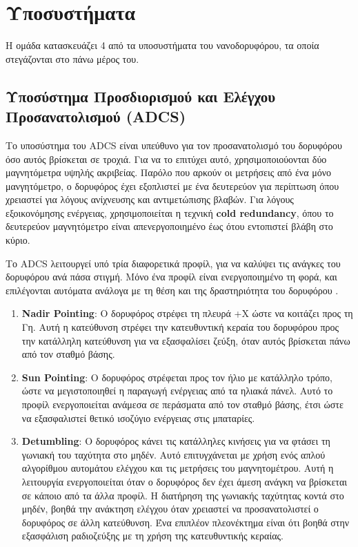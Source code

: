 \documentclass[a4paper,nobib,justified]{tufte-book}
\begin{document}
\section{Υποσυστήματα}
Η ομάδα κατασκευάζει 4 από τα υποσυστήματα του νανοδορυφόρου, τα οποία στεγάζονται στο πάνω μέρος του.
\subsection{Υποσύστημα Προσδιορισμού και Ελέγχου Προσανατολισμού (\acs{ADCS})}
Το υποσύστημα του \acs{ADCS} είναι υπεύθυνο για τον προσανατολισμό του δορυφόρου όσο αυτός βρίσκεται σε τροχιά. Για να το επιτύχει αυτό, χρησιμοποιούονται δύο μαγνητόμετρα υψηλής ακριβείας. Παρόλο που αρκούν οι μετρήσεις από ένα μόνο μανγητόμετρο, ο δορυφόρος έχει εξοπλιστεί με ένα δευτερεύον για περίπτωση όπου χρειαστεί για λόγους ανίχνευσης και αντιμετώπισης βλαβών. Για λόγους εξοικονόμησης ενέργειας, χρησιμοποιείται η τεχνική \textbf{cold redundancy}, όπου το δευτερεύον μαγνητόμετρο είναι απενεργοποιημένο έως ότου εντοπιστεί βλάβη στο κύριο.

Το \acs{ADCS} λειτουργεί υπό τρία διαφορετικά προφίλ, για να καλύψει τις ανάγκες του δορυφόρου ανά πάσα στιγμή. Μόνο ένα προφίλ είναι ενεργοποιημένο τη φορά, και επιλέγονται αυτόματα ανάλογα με τη θέση και της δραστηριότητα του δορυφόρου .
\begin{enumerate}
    \item \textbf{Nadir Pointing}: Ο δορυφόρος στρέφει τη πλευρά +X ώστε να κοιτάζει προς τη Γη. Αυτή η κατεύθυνση στρέφει την κατευθυντική κεραία του δορυφόρου προς την κατάλληλη κατεύθυνση για να εξασφαλίσει ζεύξη, όταν αυτός βρίσκεται πάνω από τον σταθμό βάσης. 
    \item \textbf{Sun Pointing}: Ο δορυφόρος στρέφεται προς τον ήλιο με κατάλληλο τρόπο, ώστε να μεγιστοποιηθεί η παραγωγή ενέργειας από τα ηλιακά πάνελ. Αυτό το προφίλ ενεργοποιείται ανάμεσα σε περάσματα από τον σταθμό βάσης, έτσι ώστε να εξασφαλιστεί θετικό ισοζύγιο ενέργειας στις μπαταρίες.
    \item \textbf{Detumbling}: Ο δορυφόρος κάνει τις κατάλληλες κινήσεις για να φτάσει τη γωνιακή του ταχύτητα στο μηδέν. Αυτό επιτυγχάνεται με χρήση ενός απλού αλγορίθμου αυτομάτου ελέγχου και τις μετρήσεις του μαγνητομέτρου. Αυτή η λειτουργία ενεργοποιείται όταν ο δορυφόρος δεν έχει άμεση ανάγκη να βρίσκεται σε κάποιο από τα άλλα προφίλ. Η διατήρηση της γωνιακής ταχύτητας κοντά στο μηδέν, βοηθά την ανάκτηση ελέγχου όταν χρειαστεί να προσανατολιστεί ο δορυφόρος σε άλλη κατεύθυνση. Ένα επιπλέον πλεονέκτημα είναι ότι βοηθά στην εξασφάλιση ραδιοζεύξης με τη χρήση της κατευθυντικής κεραίας.
\end{enumerate}
\end{document}
